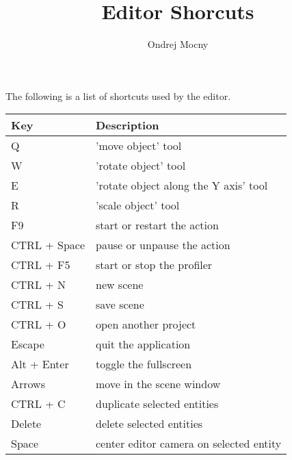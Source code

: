 \documentclass[a4paper, 12pt]{report}
\begin{document}
\pagestyle{empty} %

\title{Editor Shorcuts}
\author{Ondrej Mocny}

\pagestyle{plain} %

The following is a list of shortcuts used by the editor.

\begin{tabular}{|p{0.20\hsize}|p{0.7\hsize}|}
  \hline
  Key & Description \\
	\hline
	Q & 'move object' tool \\
	W & 'rotate object' tool \\
	E & 'rotate object along the Y axis' tool \\
	R & 'scale object' tool \\
	\hline
	F9 & start or restart the action \\
	CTRL + Space & pause or unpause the action \\
	\hline
	CTRL + F5 & start or stop the profiler \\
	CTRL + N & new scene \\
	CTRL + S & save scene \\
	CTRL + O & open another project \\
	Escape & quit the application \\
	Alt + Enter & toggle the fullscreen \\
	\hline
	Arrows & move in the scene window \\
	CTRL + C & duplicate selected entities \\
	Delete & delete selected entities \\
	Space & center editor camera on selected entity \\
	\hline
\end{tabular}
\end{document}
